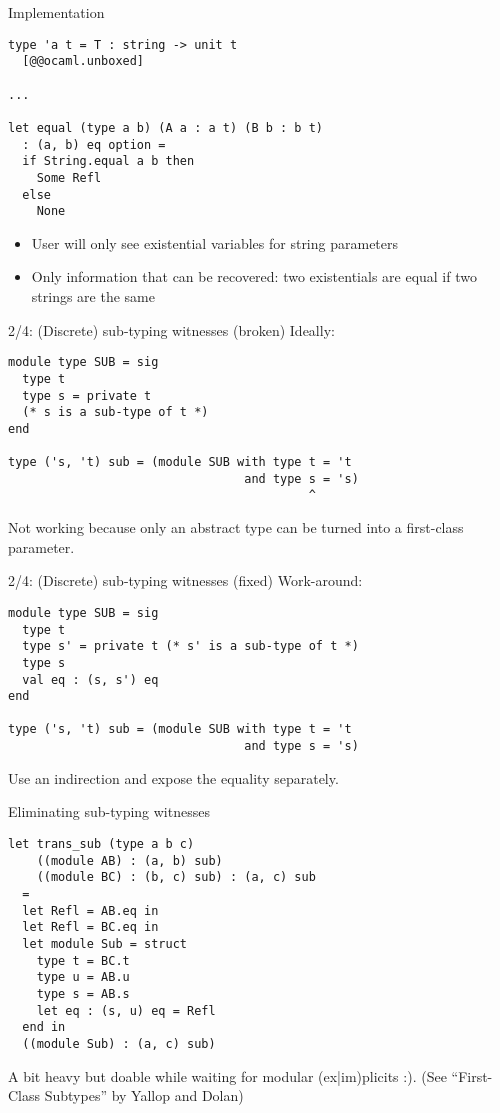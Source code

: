 \documentclass{beamer}          %
\begin{document}
\begin{frame}[fragile]{Implementation}
\begin{lstlisting}
type 'a t = T : string -> unit t
  [@@ocaml.unboxed]

...

let equal (type a b) (A a : a t) (B b : b t)
  : (a, b) eq option =
  if String.equal a b then
    Some Refl
  else
    None
\end{lstlisting}

  \begin{itemize}
    \item User will only see existential variables for string parameters
    \item Only information that can be recovered: two existentials are equal if
          two strings are the same
  \end{itemize}
\end{frame}

\begin{frame}[fragile]{2/4: (Discrete) sub-typing witnesses (broken)}
  Ideally:
\begin{lstlisting}
module type SUB = sig
  type t
  type s = private t
  (* s is a sub-type of t *)
end

type ('s, 't) sub = (module SUB with type t = 't
                                 and type s = 's)
                                          ^
\end{lstlisting}
  Not working because only an abstract type can be turned into a first-class parameter.
\end{frame}

\begin{frame}[fragile]{2/4: (Discrete) sub-typing witnesses (fixed)}
Work-around:
\begin{lstlisting}
module type SUB = sig
  type t
  type s' = private t (* s' is a sub-type of t *)
  type s
  val eq : (s, s') eq
end

type ('s, 't) sub = (module SUB with type t = 't
                                 and type s = 's)
\end{lstlisting}

  Use an indirection and expose the equality separately.
\end{frame}

\begin{frame}[fragile]{Eliminating sub-typing witnesses}

\begin{lstlisting}
let trans_sub (type a b c)
    ((module AB) : (a, b) sub)
    ((module BC) : (b, c) sub) : (a, c) sub
  =
  let Refl = AB.eq in
  let Refl = BC.eq in
  let module Sub = struct
    type t = BC.t
    type u = AB.u
    type s = AB.s
    let eq : (s, u) eq = Refl
  end in
  ((module Sub) : (a, c) sub)
\end{lstlisting}

A bit heavy but doable while waiting for modular (ex|im)plicits :).
(See ``First-Class Subtypes'' by Yallop and Dolan)
\end{frame}
\end{document}
